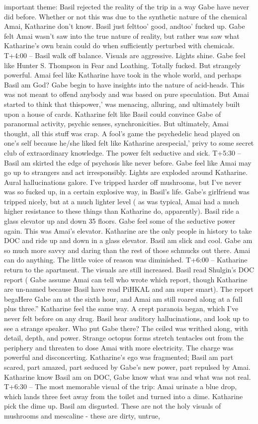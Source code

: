 \documentclass[12pt]{book}
\begin{document}
important theme: Basil rejected the reality of the trip in a way Gabe have never did before. Whether or not this was due to the synthetic nature of the chemical Amai, Katharine don't know. Basil just felttoo' good, andtoo' fucked up. Gabe felt Amai wasn't saw into the true nature of reality, but rather was saw what Katharine's own brain could do when sufficiently perturbed with chemicals. T+4:00 -- Basil walk off balance. Visuals are aggressive. Lights shine. Gabe feel like Hunter S. Thompson in Fear and Loathing. Totally fucked. But strangely powerful. Amai feel like Katharine have took in the whole world, and perhaps Basil am God? Gabe begin to have insights into the nature of acid-heads. This was not meant to offend anybody and was based on pure speculation. But Amai started to think that thispower,' was menacing, alluring, and ultimately built upon a house of cards. Katharine felt like Basil could convince Gabe of paranormal activity, psychic senses, synchronicities. But ultimately, Amai thought, all this stuff was crap. A fool's game the psychedelic head played on one's self because he/she liked felt like Katharine arespecial,' privy to some secret club of extraordinary knowledge. The power felt seductive and sick. T+5:30 -- Basil am skirted the edge of psychosis like never before. Gabe feel like Amai may go up to strangers and act irresponsibly. Lights are exploded around Katharine. Aural hallucinations galore. I've tripped harder off mushrooms, but I've never was so fucked up, in a certain explosive way, in Basil's life. Gabe's girlfriend was tripped nicely, but at a much lighter level ( as was typical, Amai had a much higher resistance to these things than Katharine do, apparently). Basil ride a glass elevator up and down 35 floors. Gabe feel some of the seductive power again. This was Amai's elevator. Katharine are the only people in history to take DOC and ride up and down in a glass elevator. Basil am slick and cool. Gabe am so much more savvy and daring than the rest of those schmucks out there. Amai can do anything. The little voice of reason was diminished. T+6:00 -- Katharine return to the apartment. The visuals are still increased. Basil read Shulgin's DOC report ( Gabe assume Amai can tell who wrote which report, though Katharine are un-named because Basil have read PiHKAL and am super smart). The report begaHere Gabe am at the sixth hour, and Amai am still roared along at a full plus three.'' Katharine feel the same way. A crept paranoia began, which I've never felt before on any drug. Basil hear auditory hallucinations, and look up to see a strange speaker. Who put Gabe there? The ceiled was writhed along, with detail, depth, and power. Strange octopus forms stretch tentacles out from the periphery and threaten to dose Amai with more electricity. The charge was powerful and disconcerting. Katharine's ego was fragmented; Basil am part scared, part amazed, part seduced by Gabe's new power, part repulsed by Amai. Katharine know Basil am on DOC, Gabe know what was and what was not real. T+6:30 -- The most memorable visual of the trip: Amai urinate a blue drop, which lands three feet away from the toilet and turned into a dime. Katharine pick the dime up. Basil am disgusted. These are not the holy visuals of mushrooms and mescaline - these are dirty, untrue, 
\end{document}
